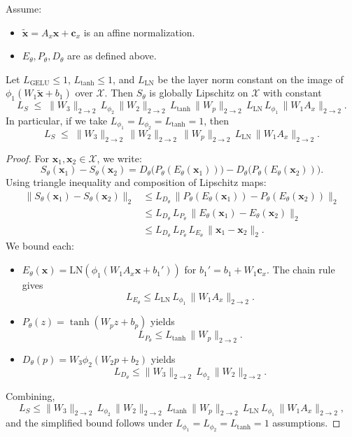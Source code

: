\documentclass[11pt]{article}
\begin{document}
\begin{theorem}
Assume:
\begin{itemize}
  \item $\tilde{\bm{x}} = A_x \bm{x} + \bm{c}_x$ is an affine normalization.
  \item $E_\theta, P_\theta, D_\theta$ are as defined above.
\end{itemize}
Let $L_\mathrm{GELU} \le 1$, $L_{\tanh} \le 1$, and $L_{\mathrm{LN}}$ be the layer norm constant on the image of $\phi_1(W_1 \tilde{\bm{x}} + b_1)$ over $\mathcal{X}$. Then $S_\theta$ is globally Lipschitz on $\mathcal{X}$ with constant
\begin{equation}
  L_S \;\le\; \|W_3\|_{2\to 2} \, L_{\phi_2} \, \|W_2\|_{2\to 2} \, L_{\tanh} \, \|W_p\|_{2\to 2} \, L_{\mathrm{LN}} \, L_{\phi_1} \, \|W_1 A_x\|_{2\to 2}.
\end{equation}
In particular, if we take $L_{\phi_1} = L_{\phi_2} = L_{\tanh} = 1$, then
\begin{equation}
  L_S \;\le\; \|W_3\|_{2\to 2} \, \|W_2\|_{2\to 2} \, \|W_p\|_{2\to 2} \, L_{\mathrm{LN}} \, \|W_1 A_x\|_{2\to 2}.
  \label{eq:Lipschitz-bound}
\end{equation}
\end{theorem}

\begin{proof}
For $\bm{x}_1, \bm{x}_2 \in \mathcal{X}$, we write:
\[
  S_\theta(\bm{x}_1) - S_\theta(\bm{x}_2) 
  = D_\theta\big(P_\theta(E_\theta(\bm{x}_1))\big)
  - D_\theta\big(P_\theta(E_\theta(\bm{x}_2))\big).
\]
Using triangle inequality and composition of Lipschitz maps:
\begin{align*}
  \|S_\theta(\bm{x}_1) - S_\theta(\bm{x}_2)\|_2
  &\le L_{D_\theta} \, \|P_\theta(E_\theta(\bm{x}_1)) - P_\theta(E_\theta(\bm{x}_2))\|_2 \\
  &\le L_{D_\theta} \, L_{P_\theta} \, \|E_\theta(\bm{x}_1) - E_\theta(\bm{x}_2)\|_2 \\
  &\le L_{D_\theta} \, L_{P_\theta} \, L_{E_\theta} \, \|\bm{x}_1 - \bm{x}_2\|_2.
\end{align*}
We bound each:
\begin{itemize}
  \item $E_\theta(\bm{x}) = \mathrm{LN}(\phi_1(W_1 A_x \bm{x} + b_1'))$ for $b_1' = b_1 + W_1 \bm{c}_x$. The chain rule gives
  \[
    L_{E_\theta} \le L_{\mathrm{LN}} \, L_{\phi_1} \, \|W_1 A_x\|_{2\to 2}.
  \]
  \item $P_\theta(z) = \tanh(W_p z + b_p)$ yields
  \[
    L_{P_\theta} \le L_{\tanh} \, \|W_p\|_{2\to 2}.
  \]
  \item $D_\theta(p) = W_3 \phi_2(W_2 p + b_2)$ yields
  \[
    L_{D_\theta} \le \|W_3\|_{2\to 2} \, L_{\phi_2} \, \|W_2\|_{2\to 2}.
  \]
\end{itemize}
Combining,
\[
  L_S \le \|W_3\|_{2\to 2} \, L_{\phi_2} \, \|W_2\|_{2\to 2} \, L_{\tanh} \, \|W_p\|_{2\to 2} \, L_{\mathrm{LN}} \, L_{\phi_1} \, \|W_1 A_x\|_{2\to 2},
\]
and the simplified bound follows under $L_{\phi_1} = L_{\phi_2} = L_{\tanh} = 1$ assumptions.
\end{proof}
\end{document}
